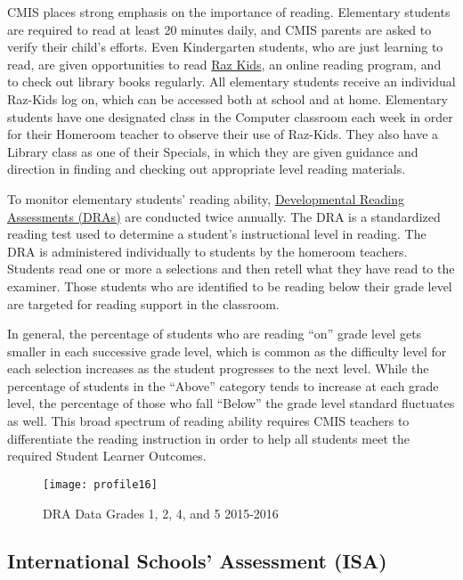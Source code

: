 CMIS places strong emphasis on the importance of reading.  Elementary students are required to read at least 20 minutes daily, and CMIS parents are asked to verify their child’s efforts.  Even Kindergarten students, who are just learning to read, are given opportunities to read \href{https://www.raz-kids.com/}{Raz Kids}, an online reading program, and to check out library books regularly.  All elementary students receive an individual Raz-Kids log on, which can be accessed both at school and at home.  Elementary students have one designated class in the Computer classroom each week in order for their Homeroom teacher to observe their use of Raz-Kids.  They also have a Library class as one of their Specials, in which they are given guidance and direction in finding and checking out appropriate level reading materials.  

To monitor elementary students’ reading ability, \href{https://drive.google.com/open?id=0ByVFfrm0zfolV29lcmM1WXVQOXc}{Developmental Reading Assessments (DRAs)} are conducted twice annually.  The DRA is a standardized reading test used to determine a student’s instructional level in reading. The DRA is administered individually to students by the homeroom teachers. Students read one or more a selections and then retell what they have read to the examiner. Those students who are identified to be reading below their grade level are targeted for reading support in the classroom. 

In general, the percentage of students who are reading “on” grade level gets smaller in each successive grade level, which is common as the difficulty level for each selection increases as the student progresses to the next level. While the percentage of students in the “Above” category tends to increase at each grade level, the percentage of those who fall “Below” the grade level standard fluctuates as well. This broad spectrum of reading ability requires CMIS teachers to differentiate the reading instruction in order to help all students meet the required Student Learner Outcomes.  

 
\begin{figure}
\centering
\texttt{[image: profile16]}
\caption{DRA Data Grades 1, 2, 4, and 5 2015-2016}
\end{figure}

\subsection{International Schools’ Assessment (ISA)}

